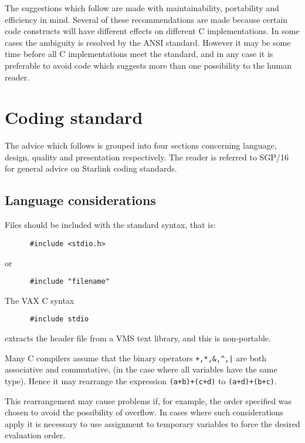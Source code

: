 The suggestions which follow are made with maintainability, portability and 
efficiency in mind.
Several of these recommendations are made because certain code constructs 
will have different effects on different C  implementations.
In some cases the ambiguity is resolved by the ANSI  standard.
However it may be some time before all C implementations meet the standard,
and in any case it is preferable to avoid code which suggests more than one
possibility to the human reader.



\section{Coding standard}

The advice which follows is grouped into four sections concerning 
language, design, quality and presentation respectively. The reader is 
referred to SGP/16 for general advice on Starlink coding standards.

\subsection{Language considerations}


Files should be included with the standard syntax, that is:
\begin{verbatim}
      #include <stdio.h>
\end{verbatim}
or 
\begin{verbatim}
      #include "filename"
\end{verbatim}

The VAX C syntax 
\begin{verbatim}
      #include stdio
\end{verbatim}
extracts the header file from a VMS text library, and this is non-portable.




Many C compilers assume that the binary operators 
\verb~+,*,&,^,|~
are both associative and commutative, (in the case where all variables have 
the same type).
Hence it may rearrange the expression
{\tt (a+b)+(c+d)} to {\tt (a+d)+(b+c)}.

This rearrangement may cause problems if, for example, the order 
specified was chosen to avoid the possibility of overflow.
In cases where such considerations apply
it is necessary to use assignment to temporary variables to force the 
desired evaluation order.


